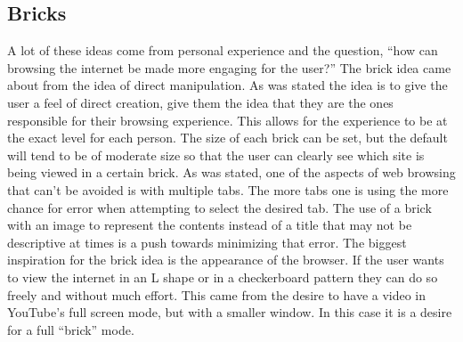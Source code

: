 \documentclass[11pt]{article}
\begin{document}
\subsection{Bricks}
A lot of these ideas come from personal experience and the question, “how can browsing the internet be made more engaging for the user?” The brick idea came about from the idea of direct manipulation. As was stated the idea is to give the user a feel of direct creation, give them the idea that they are the ones responsible for their browsing experience. This allows for the experience to be at the exact level for each person. The size of each brick can be set, but the default will tend to be of moderate size so that the user can clearly see which site is being viewed in a certain brick. As was stated, one of the aspects of web browsing that can’t be avoided is with multiple tabs. The more tabs one is using the more chance for error when attempting to select the desired tab. The use of a brick with an image to represent the contents instead of a title that may not be descriptive at times is a push towards minimizing that error. The biggest inspiration for the brick idea is the appearance of the browser. If the user wants to view the internet in an L shape or in a checkerboard pattern they can do so freely and without much effort. This came from the desire to have a video in YouTube’s full screen mode, but with a smaller window. In this case it is a desire for a full “brick” mode. 
\end{document}
